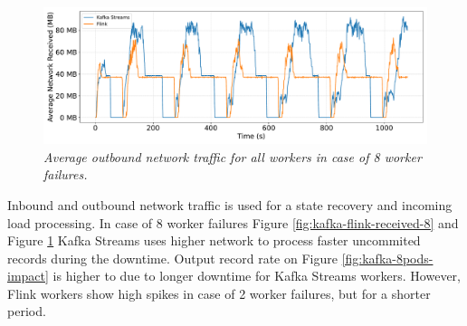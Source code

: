 \begin{figure}[H]
    \centering
    \includegraphics[width=1\textwidth]{figures/kafka-flink/network-received-8pod-kafka-flink}
    \caption{\textit{Average outbound network traffic for all workers in case of 8 worker failures.}}
    \label{fig:kafka-flink-transmitted-8}
\end{figure}

Inbound and outbound network traffic is used for a state recovery and
incoming load processing.
In case of 8 worker failures Figure \ref{fig:kafka-flink-received-8} and Figure \ref{fig:kafka-flink-transmitted-8}
Kafka Streams uses higher network to process faster uncommited records during the downtime.
Output record rate on Figure  \ref{fig:kafka-8pods-impact} is higher to due to longer downtime for
Kafka Streams workers.
However, Flink workers show high spikes in case of 2 worker failures, but for a shorter period.